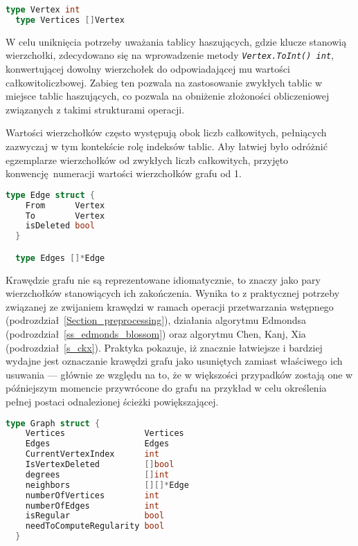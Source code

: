 \par{
  \begin{lstlisting}[language=go, caption=Typy reprezentujące wierzchołki grafu.]
  type Vertex int
  type Vertices []Vertex
  \end{lstlisting}
  W celu uniknięcia potrzeby uważania tablicy haszujących, gdzie klucze stanowią wierzchołki, zdecydowano się na wprowadzenie metody \textit{\lstinline{Vertex.ToInt() int}}, konwertującej dowolny wierzchołek do odpowiadającej mu wartości całkowitoliczbowej.
  Zabieg ten pozwala na zastosowanie zwykłych tablic w miejsce tablic haszujących, co pozwala na obniżenie złożoności obliczeniowej związanych z takimi strukturami operacji.

  Wartości wierzchołków często występują obok liczb całkowitych, pełniących zazwyczaj w tym kontekście rolę indeksów tablic.
  Aby łatwiej było odróżnić egzemplarze wierzchołków od zwykłych liczb całkowitych, przyjęto konwencję numeracji wartości wierzchołków grafu od 1.
  \begin{lstlisting}[language=go, caption=Typy reprezentujące krawędzie grafu.]
  type Edge struct {
    From      Vertex
    To        Vertex
    isDeleted bool
  }

  type Edges []*Edge
  \end{lstlisting}

  Krawędzie grafu nie są reprezentowane idiomatycznie, to znaczy jako pary wierzchołków stanowiących ich zakończenia.
  Wynika to z praktycznej potrzeby związanej ze zwijaniem krawędzi w ramach operacji przetwarzania wstępnego (podrozdział~\ref{Section_preprocessing}), działania algorytmu Edmondsa (podrozdział~\ref{ss_edmonds_blossom}) oraz algorytmu Chen, Kanj, Xia (podrozdział~\ref{s_ckx}).
  Praktyka pokazuje, iż znacznie łatwiejsze i bardziej wydajne jest oznaczanie krawędzi grafu jako usuniętych zamiast właściwego ich usuwania --- głównie ze względu na to, że w większości przypadków zostają one w późniejszym momencie przywrócone do grafu na przykład w celu określenia pełnej postaci odnalezionej ścieżki powiększającej.

  \begin{lstlisting}[language=go, caption=Struktura reprezentująca graf.]
  type Graph struct {
    Vertices                Vertices
    Edges                   Edges
    CurrentVertexIndex      int
    IsVertexDeleted         []bool
    degrees                 []int
    neighbors               [][]*Edge
    numberOfVertices        int
    numberOfEdges           int
    isRegular               bool
    needToComputeRegularity bool
  }
  \end{lstlisting}

}
